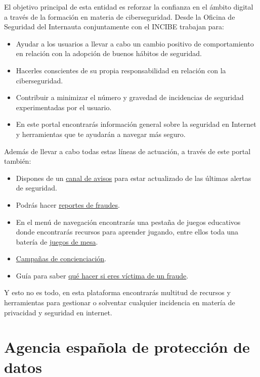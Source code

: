 \documentclass[
  spanish,
  a4paper,
  openany]{book}
\begin{document}
El objetivo principal de esta entidad es reforzar la confianza en el ámbito digital a través de la formación en materia de ciberseguridad. Desde la Oficina de Seguridad del Internauta conjuntamente con el INCIBE trabajan para:

\begin{itemize}
\item
  Ayudar a los usuarios a llevar a cabo un cambio positivo de comportamiento en relación con la adopción de buenos hábitos de seguridad.
\item
  Hacerles conscientes de su propia responsabilidad en relación con la ciberseguridad.
\item
  Contribuir a minimizar el número y gravedad de incidencias de seguridad experimentadas por el usuario.
\item
  En este portal encontrarás información general sobre la seguridad en Internet y herramientas que te ayudarán a navegar más seguro.
\end{itemize}

Además de llevar a cabo todas estas líneas de actuación, a través de este portal también:

\begin{itemize}
\item
  Dispones de un \href{https://www.osi.es/es/actualidad/avisos}{canal de avisos} para estar actualizado de las últimas alertas de seguridad.
\item
  Podrás hacer \href{https://www.osi.es/es/reporte-de-fraude}{reportes de fraudes}.
\item
  En el menú de navegación encontrarás una pestaña de juegos educativos donde encontrarás recursos para aprender jugando, entre ellos toda una batería de \href{https://www.osi.es/es/juegos-mesa}{juegos de mesa}.
\item
  \href{https://www.osi.es/es/campanas}{Campañas de concienciación}.
\item
  Guía para saber \href{https://www.osi.es/es/que-hacer-si-eres-victima-de-un-fraude}{qué hacer si eres víctima de un fraude}.
\end{itemize}

Y esto no es todo, en esta plataforma encontrarás multitud de recursos y herramientas para gestionar o solventar cualquier incidencia en matería de privacidad y seguridad en internet.

\hypertarget{agencia-espauxf1ola-de-protecciuxf3n-de-datos}{%
\section{Agencia española de protección de datos}\label{agencia-espauxf1ola-de-protecciuxf3n-de-datos}}
\end{document}
